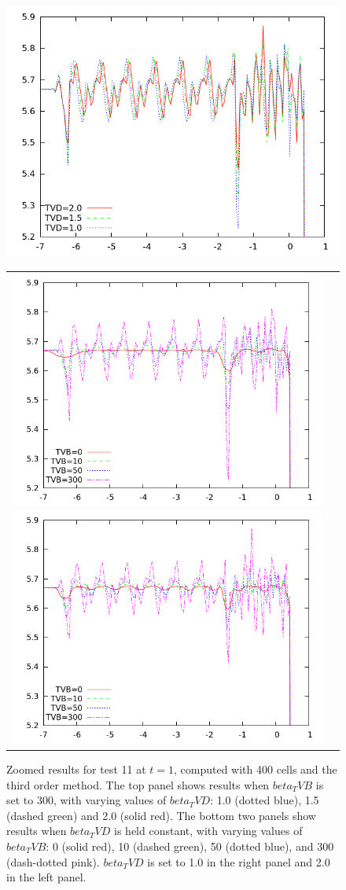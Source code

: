 \documentclass[10pt]{article}
\begin{document}
\begin{figure}[h]
  \begin{center}
     \includegraphics[width=.95\textwidth]{11_300zoom.png}	
	\begin{tabular}{cc}
     \includegraphics[width=.475\textwidth]{11_1zoom.png}
     \includegraphics[width=.475\textwidth]{11_2zoom.png}	
    \end{tabular}
  \end{center}
  \caption{Zoomed results for test 11 at $t=1$, computed with 400 cells and the third order method. The top panel shows results when $beta_TVB$ is set to 300, with varying values of $beta_TVD$: 1.0 (dotted blue), 1.5 (dashed green) and 2.0 (solid red). The bottom two panels show results when $beta_TVD$ is held constant, with varying values of $beta_TVB$: 0 (solid red), 10 (dashed green), 50 (dotted blue), and 300 (dash-dotted pink). $beta_TVD$ is set to 1.0 in the right panel and 2.0 in the left panel.}
\end{figure}
\clearpage
\end{document}

